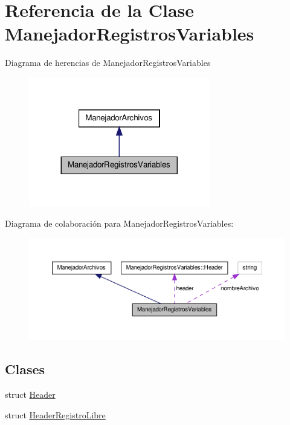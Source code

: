 \hypertarget{class_manejador_registros_variables}{\section{\-Referencia de la \-Clase \-Manejador\-Registros\-Variables}
\label{class_manejador_registros_variables}
}


\-Diagrama de herencias de \-Manejador\-Registros\-Variables
\nopagebreak
\begin{figure}[H]
\begin{center}
\leavevmode
\includegraphics[width=224pt]{class_manejador_registros_variables__inherit__graph}
\end{center}
\end{figure}


\-Diagrama de colaboración para \-Manejador\-Registros\-Variables\-:
\nopagebreak
\begin{figure}[H]
\begin{center}
\leavevmode
\includegraphics[width=350pt]{class_manejador_registros_variables__coll__graph}
\end{center}
\end{figure}
\subsection*{\-Clases}
\begin{DoxyCompactItemize}
\item 
struct \hyperlink{struct_manejador_registros_variables_1_1_header}{\-Header}
\item 
struct \hyperlink{struct_manejador_registros_variables_1_1_header_registro_libre}{\-Header\-Registro\-Libre}
\end{DoxyCompactItemize}
